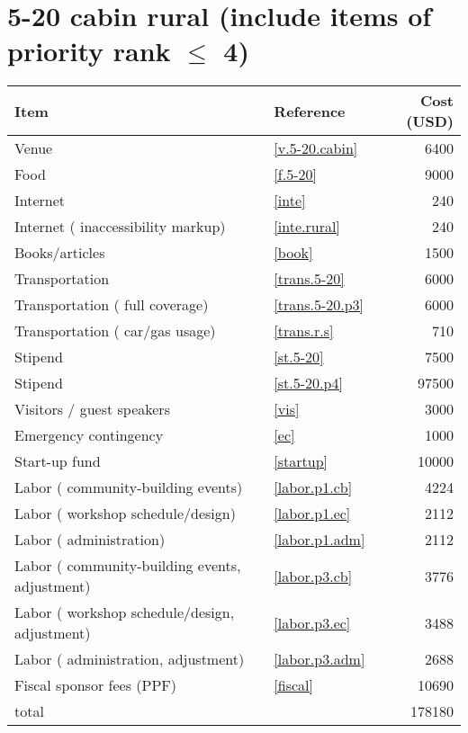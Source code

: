 \section*{5-20 cabin rural (include items of priority rank $\leq$ 4)}
\begin{center}
\begin{tabular}{llr}
Item & Reference & Cost (USD) \\ \hline
Venue & \ref{v.5-20.cabin} & 6400 \\
Food & \ref{f.5-20} & 9000 \\
Internet & \ref{inte} & 240 \\
Internet ( inaccessibility markup) & \ref{inte.rural} & 240 \\
Books/articles & \ref{book} & 1500 \\
Transportation & \ref{trans.5-20} & 6000 \\
Transportation ( full coverage) & \ref{trans.5-20.p3} & 6000 \\
Transportation ( car/gas usage) & \ref{trans.r.s} & 710 \\
Stipend & \ref{st.5-20} & 7500 \\
Stipend & \ref{st.5-20.p4} & 97500 \\
Visitors / guest speakers & \ref{vis} & 3000 \\
Emergency contingency & \ref{ec} & 1000 \\
Start-up fund & \ref{startup} & 10000 \\
Labor ( community-building events) & \ref{labor.p1.cb} & 4224 \\
Labor ( workshop schedule/design) & \ref{labor.p1.ec} & 2112 \\
Labor ( administration) & \ref{labor.p1.adm} & 2112 \\
Labor ( community-building events, adjustment) & \ref{labor.p3.cb} & 3776 \\
Labor ( workshop schedule/design, adjustment) & \ref{labor.p3.ec} & 3488 \\
Labor ( administration, adjustment) & \ref{labor.p3.adm} & 2688 \\
Fiscal sponsor fees (PPF) & \ref{fiscal} & 10690 \\ \hline
total &  & 178180
\end{tabular}
\end{center}
\newpage
